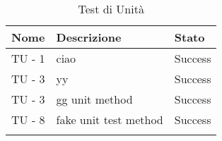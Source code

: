 \begin{center}
\bgroup
\def\arraystretch{1.5}
\begin{longtable}{ | p{3cm} | p{9cm} | p{2cm} | }
\hline
\cellcolor[gray]{0.9} \textbf{Nome} & \cellcolor[gray]{0.9} \textbf{Descrizione} & \cellcolor[gray]{0.9} \textbf{Stato}
 \\ \hline
TU - 1 & ciao & Success \\ \hline
TU - 3 & yy & Success \\ \hline
TU - 3 & gg unit method  & Success \\ \hline
TU - 8 & fake unit test method & Success \\ \hline
\caption{Test di Unità}
\end{longtable}
\egroup
\end{center}
